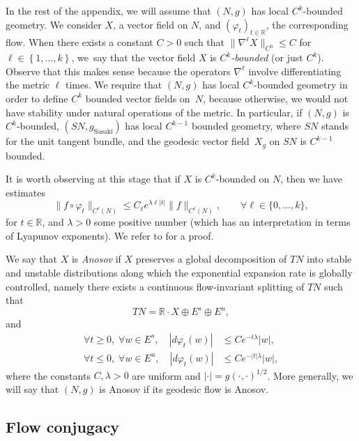 \documentclass[JEP,XML,SOM,Unicode,NoFloatCountersInSection]{cedram}
\newcommand{\R}{\mathbb{R}}
\theoremstyle{plain}
\theoremstyle{definition}
\begin{document}
In the rest of the appendix, we will assume that $(N,g)$ has local $C^k$-bounded geometry. We consider $X$, a vector field on $N$, and $(\varphi_t)_{t \in \R}$, the corresponding flow. When there exists a constant $C > 0$ such that $\|\nabla^\ell X\|_{C^0} \leq C$ for $\ell \in \left\{1,\dots, k\right\}$, we~say that the vector field $X$ is \emph{$C^k$-bounded} (or just $C^k$). Observe that this makes sense because the operators $\nabla^\ell$ involve differentiating the metric $\ell$ times. We require that $(N,g)$ has local $C^k$-bounded geometry in order to define $C^k$ bounded vector fields on~$N$, because otherwise, we would not have stability under natural operations of the metric. In particular, if $(N,g)$ is $C^k$-bounded, $(SN, g_{\text{Sasaki}})$ has local $C^{k-1}$ bounded geometry, where $SN$ stands for the unit tangent bundle, and the geodesic vector field~$X_g$ on $SN$ is $C^{k-1}$ bounded.

It is worth observing at this stage that if $X$ is $C^k$-bounded on $N$, then we have estimates
\[
\| f\circ \varphi_t \|_{C^\ell(N)} \leq C_\ell e^{\lambda \ell |t|} \| f \|_{C^\ell(N)},\qquad \forall \ell \in\{0,\dots,k\},
\]
for $t\in \R$, and $\lambda > 0$ some positive number (which has an interpretation in terms of Lyapunov exponents). We refer to \cite[Prop.\,A.4.A]{Bonthonneau-15} for a proof.

We say that $X$ is \emph{Anosov} if $X$ preserves a global decomposition of $TN$ into stable and unstable distributions along which the exponential expansion rate is globally controlled, namely there exists a continuous flow-invariant splitting of $TN$ such that
\[
T N= \R \cdot X \oplus E^s \oplus E^u,
\]
and
\begin{equation}
\begin{split}
\forall t \geq 0,\; \forall w \in E^s,\quad |d\varphi_t(w)| &\leq Ce^{-t\lambda}|w|, \\
\forall t \leq 0,\; \forall w \in E^u,\quad |d\varphi_t(w)| &\leq Ce^{-|t|\lambda}|w|,
\end{split}
\end{equation}
where the constants $C,\lambda > 0$ are uniform and $|\cdot|=g(\cdot,\cdot)^{1/2}$. More generally, we will say that $(N,g)$ is Anosov if its geodesic flow is Anosov.

\subsection{Flow conjugacy}
\label{sec:conjugation}
\end{document}

